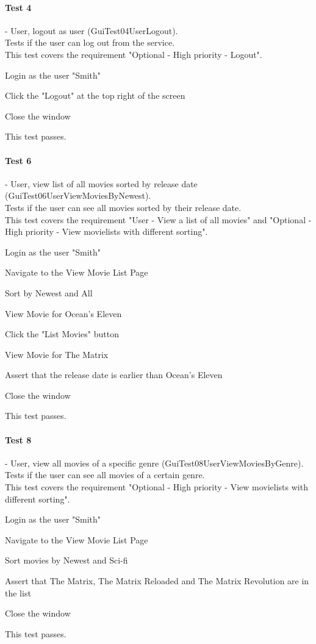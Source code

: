 \paragraph{Test 4} - User, logout as user (GuiTest04UserLogout). \\
Tests if the user can log out from the service. \\
This test covers the requirement "Optional - High priority -  Logout".
\begin{my_enumerate}
\item Login as the user "Smith"
\item Click the "Logout" at the top right of the screen
\item Close the window
\end{my_enumerate}
This test passes.

\paragraph{Test 6} - User, view list of all movies sorted by release date (GuiTest06UserViewMoviesByNewest). \\
Tests if the user can see all movies sorted by their release date. \\
This test covers the requirement "User - View a list of all movies" and "Optional - High priority - View movielists with different sorting".
\begin{my_enumerate}
\item Login as the user "Smith"
\item Navigate to the View Movie List Page
\item Sort by Newest and All
\item View Movie for Ocean's Eleven
\item Click the "List Movies" button
\item View Movie for The Matrix
\item Assert that the release date is earlier than Ocean's Eleven
\item Close the window
\end{my_enumerate}
This test passes.

\paragraph{Test 8} - User, view all movies of a specific genre (GuiTest08UserViewMoviesByGenre). \\
Tests if the user can see all movies of a certain genre. \\
This test covers the requirement "Optional - High priority - View movielists with different sorting".
\begin{my_enumerate}
\item Login as the user "Smith"
\item Navigate to the View Movie List Page
\item Sort movies by Newest and Sci-fi
\item Assert that The Matrix, The Matrix Reloaded and The Matrix Revolution are in the list
\item Close the window
\end{my_enumerate}
This test passes.

